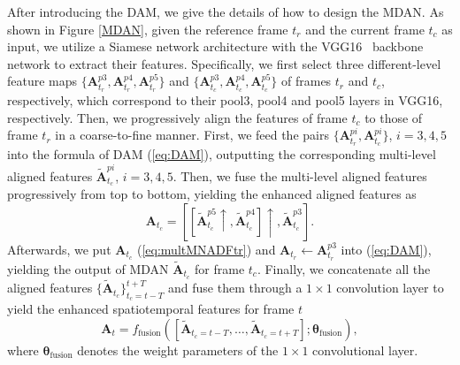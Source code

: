 \documentclass[review]{elsarticle}
\begin{document}
After introducing the DAM, we give the details of how to design the MDAN.
As shown in Figure \ref{MDAN}, given the reference frame $t_r$ and the current frame $t_c$ as input, we utilize a Siamese network architecture with the VGG16~\cite{simonyan2014very} backbone network to extract their features.
Specifically, we first select three different-level feature maps $\{\bm{A}_{t_r}^{p3},\bm{A}_{t_r}^{p4},\bm{A}_{t_r}^{p5}\}$ and $\{\bm{A}_{t_c}^{p3},\bm{A}_{t_c}^{p4},\bm{A}_{t_c}^{p5}\}$ of frames $t_r$ and $t_c$, respectively, which correspond to their pool3, pool4 and pool5 layers in VGG16, respectively.
Then, we progressively align the features of frame $t_c$ to those of frame $t_r$ in a coarse-to-fine manner.
First, we feed the pairs $\{\bm{A}_{t_r}^{pi},\bm{A}_{t_c}^{pi}\}$, $i=3,4,5$ into the formula of DAM (\ref{eq:DAM}), outputting the corresponding multi-level aligned features $\widetilde{\bm{A}}_{t_c}^{pi}$, $i=3,4,5$.
Then, we fuse the multi-level aligned features progressively from top to bottom, yielding the enhanced aligned features as
\begin{equation}
\bm{A}_{t_c}=[[\widetilde{\bm{A}}_{t_c}^{p5} \uparrow, \widetilde{\bm{A}}_{t_c}^{p4}]\uparrow,\widetilde{\bm{A}}_{t_c}^{p3}].
\label{eq:multMNADFtr}
\end{equation}
Afterwards, we put $\bm{A}_{t_c}$ (\ref{eq:multMNADFtr}) and $\bm{A}_{t_r}\leftarrow\bm{A}_{t_r}^{p3}$ into (\ref{eq:DAM}), yielding the output of MDAN $\widetilde{\bm{A}}_{t_c}$ for frame $t_c$.
Finally, we concatenate all the aligned features $\{\widetilde{\bm{A}}_{t_c}\}_{t_c=t-T}^{t+T}$ and fuse them through a $1\times 1$ convolution layer to yield the enhanced spatiotemporal features for frame $t$
\begin{equation}
\label{eq:fusion}
\bm{A}_t = f_{\mathrm{fusion}}([\widetilde{\bm{A}}_{t_c=t-T},\ldots,\widetilde{\bm{A}}_{t_c=t+T}];\bm{\theta}_{\mathrm{fusion}}),
\end{equation}
where $\bm{\theta}_{\mathrm{fusion}}$ denotes the weight parameters of the $1\times 1$ convolutional layer.
\end{document}
